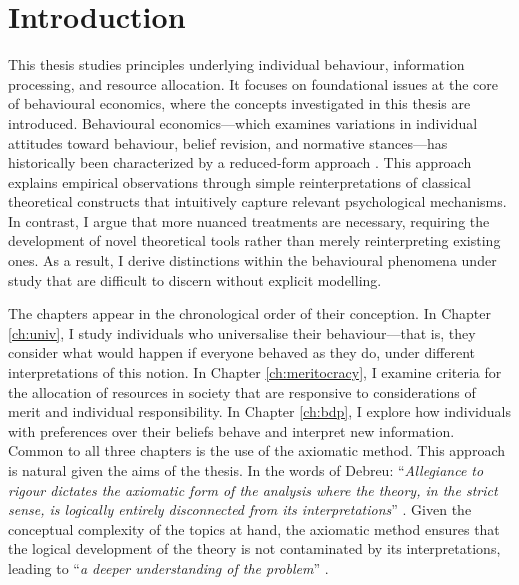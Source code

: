 \chapter{Introduction}\label{ch:intro}

This thesis studies principles underlying individual behaviour, information processing, and resource allocation. It focuses on foundational issues at the core of behavioural economics, where the concepts investigated in this thesis are introduced. Behavioural economics—which examines variations in individual attitudes toward behaviour, belief revision, and normative stances—has historically been characterized by a reduced-form approach \citep{spieglerBehavioralEconomicsAtheoretical2019}. This approach explains empirical observations through simple reinterpretations of classical theoretical constructs that intuitively capture relevant psychological mechanisms. In contrast, I argue that more nuanced treatments are necessary, requiring the development of novel theoretical tools rather than merely reinterpreting existing ones. As a result, I derive distinctions within the behavioural phenomena under study that are difficult to discern without explicit modelling.

The chapters appear in the chronological order of their conception. In Chapter \ref{ch:univ}, I study individuals who universalise their behaviour—that is, they consider what would happen if everyone behaved as they do, under different interpretations of this notion. In Chapter \ref{ch:meritocracy}, I examine criteria for the allocation of resources in society that are responsive to considerations of merit and individual responsibility. In Chapter \ref{ch:bdp}, I explore how individuals with preferences over their beliefs behave and interpret new information. Common to all three chapters is the use of the axiomatic method. This approach is natural given the aims of the thesis. In the words of Debreu: “\textit{Allegiance to rigour dictates the axiomatic form of the analysis where the theory, in the strict sense, is logically entirely disconnected from its interpretations}” \citep[p. x]{debreuTheoryValueAxiomatic1959}. Given the conceptual complexity of the topics at hand, the axiomatic method ensures that the logical development of the theory is not contaminated by its interpretations, leading to “\textit{a deeper understanding of the problem}” \citep[p. x]{debreuTheoryValueAxiomatic1959}.

